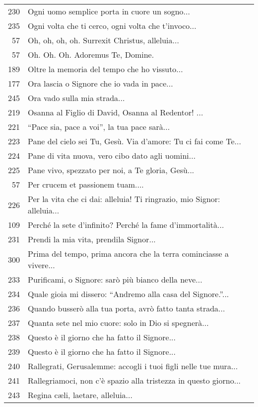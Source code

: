 {\begin{flushleft}
\begin{longtable}{r m{11cm}}
    230 & Ogni uomo semplice porta in cuore un sogno...\\
    235 & Ogni volta che ti cerco, ogni volta che t'invoco...\\
    57 & Oh, oh, oh, oh. Surrexit Christus, alleluia...\\
    57 & Oh. Oh. Oh. Adoremus Te, Domine.\\
    189 & Oltre la memoria del tempo che ho vissuto...\\
    177 & Ora lascia o Signore che io vada in pace...\\
    245 & Ora vado sulla mia strada...\\
    219 & Osanna al Figlio di David, Osanna al Redentor! ...\\
    221 & ``Pace sia, pace a voi'', la tua pace sarà...\\
    223 & Pane del cielo sei Tu, Gesù. Via d'amore: Tu ci fai come Te...\\
    224 & Pane di vita nuova, vero cibo dato agli uomini...\\
    225 & Pane vivo, spezzato per noi, a Te gloria, Gesù...\\
    57 & Per crucem et passionem tuam....\\
    226 & Per la vita che ci dai: alleluia! Ti ringrazio, mio Signor: alleluia...\\
    109 & Perché la sete d'infinito? Perché la fame d'immortalità...\\
    231 & Prendi la mia vita, prendila Signor...\\
    300 & Prima del tempo, prima ancora che la terra cominciasse a vivere...\\
    233 & Purificami, o Signore: sarò più bianco della neve...\\
    234 & Quale gioia mi dissero: ``Andremo alla casa del Signore.''...\\
    236 & Quando busserò alla tua porta, avrò fatto tanta strada...\\
    237 & Quanta sete nel mio cuore: solo in Dio si spegnerà...\\
    238 & Questo è il giorno che ha fatto il Signore...\\
    239 & Questo è il giorno che ha fatto il Signore...\\
    240 & Rallegrati, Gerusalemme: accogli i tuoi figli nelle tue mura...\\
    241 & Rallegriamoci, non c'è spazio alla tristezza in questo giorno...\\
    243 & Regina c\ae li, laetare, alleluia...\\

\end{longtable}
\end{flushleft}}
